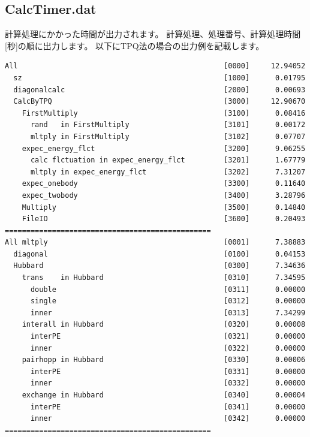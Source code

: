 \subsection{CalcTimer.dat}
計算処理にかかった時間が出力されます。
計算処理、処理番号、計算処理時間[秒]の順に出力します。
以下にTPQ法の場合の出力例を記載します。\\
\begin{minipage}{16cm}
\begin{screen}
\begin{verbatim}
All                                                [0000]     12.94052
  sz                                               [1000]      0.01795
  diagonalcalc                                     [2000]      0.00693
  CalcByTPQ                                        [3000]     12.90670
    FirstMultiply                                  [3100]      0.08416
      rand   in FirstMultiply                      [3101]      0.00172
      mltply in FirstMultiply                      [3102]      0.07707
    expec_energy_flct                              [3200]      9.06255
      calc flctuation in expec_energy_flct         [3201]      1.67779
      mltply in expec_energy_flct                  [3202]      7.31207
    expec_onebody                                  [3300]      0.11640
    expec_twobody                                  [3400]      3.28796
    Multiply                                       [3500]      0.14840
    FileIO                                         [3600]      0.20493
================================================
All mltply                                         [0001]      7.38883
  diagonal                                         [0100]      0.04153
  Hubbard                                          [0300]      7.34636
    trans    in Hubbard                            [0310]      7.34595
      double                                       [0311]      0.00000
      single                                       [0312]      0.00000
      inner                                        [0313]      7.34299
    interall in Hubbard                            [0320]      0.00008
      interPE                                      [0321]      0.00000
      inner                                        [0322]      0.00000
    pairhopp in Hubbard                            [0330]      0.00006
      interPE                                      [0331]      0.00000
      inner                                        [0332]      0.00000
    exchange in Hubbard                            [0340]      0.00004
      interPE                                      [0341]      0.00000
      inner                                        [0342]      0.00000
================================================
\end{verbatim}
\end{screen}
\end{minipage}

